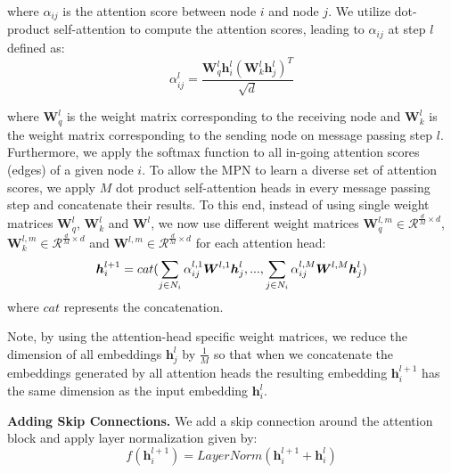 \documentclass{article}
\begin{document}
where $\alpha_{ij}$ is the attention score between node $i$ and node $j$. 
We utilize dot-product self-attention to compute the attention scores, leading to $\alpha_{ij}$ at step $l$ defined as:
\begin{equation}
\label{equ:alpha}
    \alpha_{ij}^l = \frac{\boldsymbol{W}_q^l \boldsymbol{h}_i^l (\boldsymbol{W}_k^l \boldsymbol{h}_j^l)^T}{\sqrt{d}}
\end{equation}

where $\boldsymbol{W}_q^l$ is the weight matrix corresponding to the receiving node and $\boldsymbol{W}_k^l$ is the weight matrix corresponding to the sending node on message passing step $l$. Furthermore, we apply the softmax function to all in-going attention scores (edges) of a given node $i$. To allow the MPN to learn a diverse set of attention scores, we apply $M$ dot product self-attention heads in every message passing step and concatenate their results. To this end, instead of using single weight matrices $\boldsymbol{W}_q^l$, $\boldsymbol{W}_k^l$ and $\boldsymbol{W}^l$, we now use different weight matrices $\boldsymbol{W}_q^{l, m} \in \mathcal{R}^{\frac{d}{M} \times d}$, $\boldsymbol{W}_k^{l, m} \in \mathcal{R}^{\frac{d}{M} \times d}$ and $\boldsymbol{W}^{l, m} \in \mathcal{R}^{\frac{d}{M} \times d}$ for each attention head: 
\begin{equation}
\label{equ:multihead}
    \boldsymbol{h}_i^{l+1}  = cat(\sum_{j \in N_i} \alpha_{ij}^{l,1} \boldsymbol{W}^{l,1}\boldsymbol{h}_j^l, ..., \sum_{j \in N_i} \alpha_{ij}^{l,M} \boldsymbol{W}^{l,M}\boldsymbol{h}_j^l) \\
\end{equation}
where $cat$ represents the concatenation.

Note, by using the attention-head specific weight matrices, we reduce the dimension of all embeddings $\boldsymbol{h}_j^l$ by $\frac{1}{M}$ so that when we concatenate the embeddings generated by all attention heads the resulting embedding $\boldsymbol{h}_i^{l+1}$ has the same dimension as the input embedding $\boldsymbol{h}_i^{l}$.

\noindent\textbf{Adding Skip Connections.} We add a skip connection around the attention block \cite{7780459} and apply layer normalization \cite{DBLP:journals/corr/BaKH16} given by:
\begin{equation}
\label{equ:norm1res1}
    f(\boldsymbol{h}_i^{l+1}) = LayerNorm(\boldsymbol{h}_i^{l+1} + \boldsymbol{h}_i^{l})
\end{equation}
\end{document}

